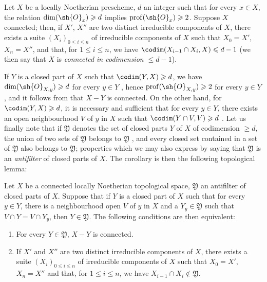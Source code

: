 \begin{corollary}[5.10.8]
\label{IV.5.10.8}
Let $X$ be a locally Noetherian prescheme, $d$ an integer such that for every $x\in X$, the relation $\dim(\sh{O}_x)\geqslant d$ implies $\operatorname{prof}(\sh{O}_x)\geqslant 2$.
Suppose $X$ connected; then, if $X'$, $X''$ are two distinct irreducible components of $X$, there exists a suite $(X_i)_{0\leqslant i\leqslant n}$ of irreducible components of $X$ such that $X_0=X'$, $X_n=X''$, and that, for $1\leqslant i\leqslant n$, we have $\codim(X_{i-1}\cap X_i,X)\leqslant d-1$ (we then say that $X$ is \emph{connected in codimension $\leqslant d-1$}).

If $Y$ is a closed part of $X$ such that $\codim(Y,X)\geqslant d$, we have $\dim(\sh{O}_{X,y})\geqslant d$ for every $y\in Y$ , hence $\operatorname{prof}(\sh{O}_{X,y})\geqslant 2$ for every $y\in Y$, and it follows from  that $X-Y$ is connected.
On the other hand, for $\codim(Y,X)\geqslant d$, it is necessary and sufficient that for every $y\in Y$, there exists an open neighbourhood $V$ of $y$ in $X$ such that $\codim(Y\cap V,V)\geqslant d$ .
Let us finally note that if $\mathfrak{Y}$ denotes the set of closed parts $Y$ of $X$ of codimension $\geqslant d$, the union of two sets of $\mathfrak{Y}$ belongs to $\mathfrak{Y}$ , and every closed set contained in a set of $\mathfrak{Y}$ also belongs to $\mathfrak{Y}$; properties which we may also express by saying that $\mathfrak{Y}$ is an \emph{antifilter} of closed parts of $X$.
The corollary is then the following topological lemma:
\end{corollary}

\begin{lemma}[5.10.8.1]
\label{IV.5.10.8.1}
Let $X$ be a connected locally Noetherian topological space, $\mathfrak{Y}$ an antifilter of closed parts of $X$.
Suppose that if $Y$ is a closed part of $X$ such that for every $y\in Y$, there is a neighbourhood open $V$ of $y$ in $X$ and a $Y_y\in\mathfrak{Y}$ such that $V\cap Y=V\cap Y_y$, then $Y\in\mathfrak{Y}$.
The following conditions are then equivalent:
\begin{enumerate}[label=\emph{\alph*)}]
  \item For every $Y\in\mathfrak{Y}$, $X-Y$ is connected.
  \item If $X'$ and $X''$ are two distinct irreducible components of $X$, there exists a suite $(X_i)_{0\leqslant i\leqslant n}$ of irreducible components of $X$ such that $X_0=X'$, $X_n=X''$ and that, for $1\leqslant i\leqslant n$, we have $X_{i-1}\cap X_i\notin\mathfrak{Y}$.
\end{enumerate}
\end{lemma}

